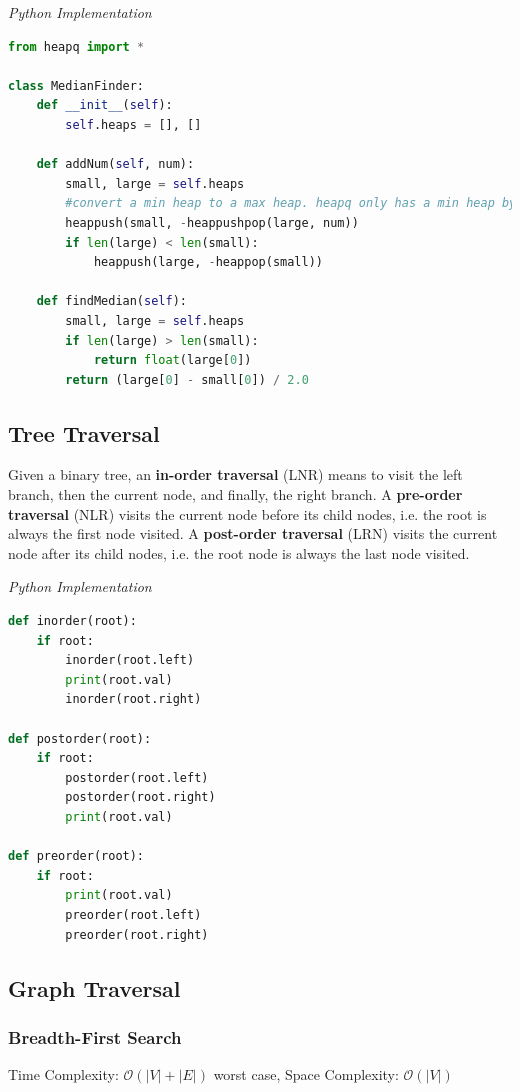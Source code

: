 \documentclass{article}
\newcommand{\bigO}{\mathcal{O}}
\begin{document}
\vspace{8pt} \emph{Python Implementation}
\begin{lstlisting}[language=Python]
from heapq import *

class MedianFinder:
    def __init__(self):
        self.heaps = [], []

    def addNum(self, num):
        small, large = self.heaps
        #convert a min heap to a max heap. heapq only has a min heap by default.
        heappush(small, -heappushpop(large, num))
        if len(large) < len(small):
            heappush(large, -heappop(small))

    def findMedian(self):
        small, large = self.heaps
        if len(large) > len(small):
            return float(large[0])
        return (large[0] - small[0]) / 2.0
\end{lstlisting}

    \subsection{Tree Traversal}
    Given a binary tree, an \textbf{in-order traversal} (LNR) means to visit the left branch, then the current node, and finally, the right branch. A \textbf{pre-order traversal} (NLR) visits the current node before its child nodes, i.e. the root is always the first node visited. A \textbf{post-order traversal} (LRN) visits the current node after its child nodes, i.e. the root node is always the last node visited.

\vspace{8pt} \emph{Python Implementation}
\begin{lstlisting}[language=Python]  
def inorder(root): 
    if root: 
        inorder(root.left) 
        print(root.val)
        inorder(root.right) 
  
def postorder(root): 
    if root: 
        postorder(root.left) 
        postorder(root.right) 
        print(root.val)
        
def preorder(root): 
    if root: 
        print(root.val)
        preorder(root.left) 
        preorder(root.right) 
\end{lstlisting}
    \subsection{Graph Traversal}
    
    \subsubsection{Breadth-First Search}
    Time Complexity: $\bigO(|V| + |E|)$ worst case, Space Complexity: $\bigO(|V|)$
    
\end{document}
